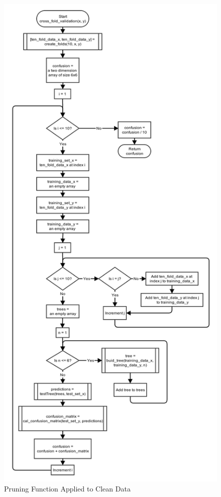 \documentclass[11pt,a4paper]{article}
\begin{document}
\begin{figure}[p]
		\includegraphics[width=\textwidth, height=\textheight]{images/flow_chart/cross_fold_validation.png}
     	\caption{Pruning Function Applied to Clean Data}
     	\label{fig:pruningClean}
\end{figure}
\end{document}
